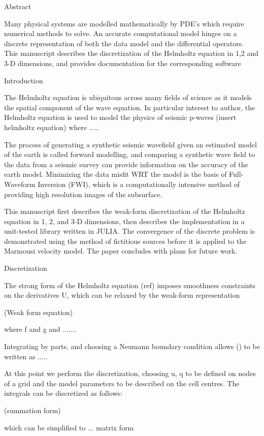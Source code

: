 Abstract

Many physical systems are modelled mathematically by PDE's which require numerical methods to solve. An accurate computational model hinges on a discrete representation of both the data model and the differential operators. This manuscript describes the discretization of the Helmholtz equation in 1,2 and 3-D dimensions, and provides documentation for the corresponding software

Introduction

The Helmholtz equation is ubiquitous across many fields of science as it models the spatial component of the wave equation. In particular interest to author, the Helmholtz equation is used to model the physics of seismic p-waves
(insert helmholtz equation)
where ..... 

The process of generating a synthetic seismic wavefield given an estimated model of the earth is called forward modelling, and comparing a synthetic wave field to the data from a seismic survey can provide information on the accuracy of the earth model. Minimizing the data misfit WRT the model is the basis of Full-Waveform Inversion (FWI), which is a computationally intensive method of providing high resolution images of the subsurface.

This manuscript first describes the weak-form discretization of the Helmholtz equation in 1, 2, and 3-D dimensions, then describes the implementation in a unit-tested library written in JULIA. The convergence of the discrete problem is demonstrated using the method of fictitious sources before it is applied to the Marmousi velocity model. The paper concludes with plans for future work.


Discretization

The strong form of the Helmholtz equation (ref) imposes smoothness constraints on the derivatives U, which can be relaxed by the weak-form representation

(Weak form equation)

where f and g and .......

Integrating by parts, and choosing a Neumann boundary condition allows () to be written as .....

At this point we perform the discretization, choosing u, q to be defined on nodes of a grid and the model parameters to be described on the cell centres. The integrals can be discretized as follows:

(summation form)

which can be simplified to ...
matrix form

